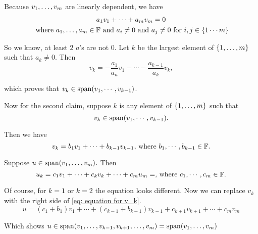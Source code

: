 \begin{prf}
  Because $v_1, \dots, v_m$ are linearly dependent, we have 
  \begin{multline}
    a_1 v_1 + \cdots + a_m v_m = 0 \\
    $ where $a_1, \ldots, a_m \in \myF$ and $a_i \neq 0$ and $a_j \neq 0 $ for $i,j \in \{1 \cdots m\}
  \end{multline} 
  
  So we know, at least $2$ $a$'s are not $0$. 
  Let $k$ be the largest element of $\{ 1, \ldots, m \}$ such that $a_k \neq 0$. Then
  \begin{equation}
    v_k = - \frac{a_1}{a_n}v_1 - \cdots - \frac{a_{k-1}}{a_k}v_k,
  \end{equation}
  
  which proves that $v_k \in \operatorname{span} (v_1, \cdots, v_{k-1})$.
  
  Now for the second claim, suppose $k$ is any element of $\{ 1, \ldots, m \}$ such that 
  \begin{equation}
    v_k \in \operatorname{span} (v_1, \cdots, v_{k-1}).
  \end{equation}
  
  Then we have 
  \begin{equation}
    v_k = b_1v_1 + \cdots + b_{k-1}v_{k-1}, $ where $b_1, \cdots, b_{k-1} \in \myF.
    \label{eq: equation for v_k}
  \end{equation}
  
  Suppose $u \in \operatorname{span} (v_1, \ldots, v_m).$ Then
  \begin{equation}
  u_k = c_1v_1 + \cdots + c_kv_k + \cdots +c_{m}u_{m} = , $ where $c_1, \cdots, c_{m} \in \myF.
  \end{equation}
  
  Of course, for $k=1$ or $k=2$ the equation looks different. Now we can replace $v_k$ with the right side of \ref{eq: equation for v_k}.
  \begin{equation}
    u = (c_1+b_1)v_1 + \cdots + (c_{k-1} + b_{k-1})v_{k-1} + c_{k+1} v_{k+1} + \cdots + c_m v_m
  \end{equation}
  
  Which shows $u \in \operatorname{span} (v_1, \dots, v_{k-1}, v_{k+1}, \dots, v_m) = \operatorname{span} (v_1, \dots, v_m)$
\end{prf}
\setcounter{thm}{21}

